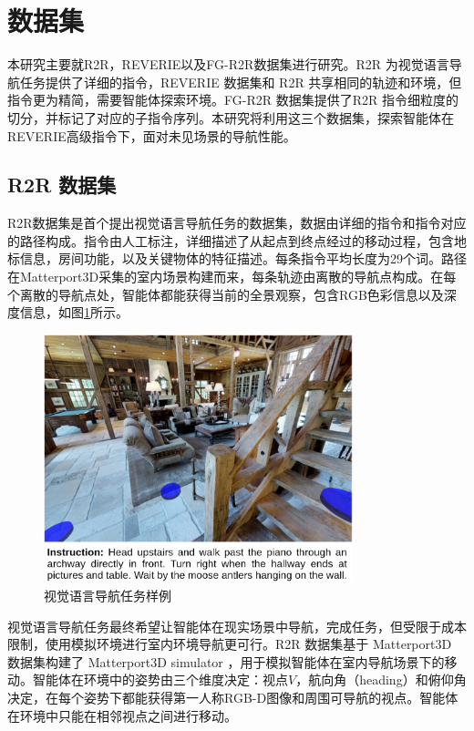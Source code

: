 \documentclass[bachelor]{thesis-uestc}
\begin{document}
\section{数据集}

本研究主要就R2R，REVERIE以及FG-R2R数据集进行研究。R2R 为视觉语言导航任务提供了详细的指令，REVERIE 数据集和 R2R 共享相同的轨迹和环境，但指令更为精简，需要智能体探索环境。FG-R2R 数据集提供了R2R 指令细粒度的切分，并标记了对应的子指令序列。本研究将利用这三个数据集，探索智能体在REVERIE高级指令下，面对未见场景的导航性能。

\subsection{R2R 数据集}
R2R数据集是首个提出视觉语言导航任务的数据集，数据由详细的指令和指令对应的路径构成。指令由人工标注，详细描述了从起点到终点经过的移动过程，包含地标信息，房间功能，以及关键物体的特征描述。每条指令平均长度为29个词。路径在Matterport3D采集的室内场景构建而来，每条轨迹由离散的导航点构成。在每个离散的导航点处，智能体都能获得当前的全景观察，包含RGB色彩信息以及深度信息，如图\ref{r2r}所示。

\begin {figure}[h]
\centering %
\includegraphics[width=0.8\textwidth]{4556-042815.png}
\caption{视觉语言导航任务样例} %
\label{r2r}
\end {figure}

视觉语言导航任务最终希望让智能体在现实场景中导航，完成任务，但受限于成本限制，使用模拟环境进行室内环境导航更可行。R2R 数据集基于 Matterport3D 数据集构建了 Matterport3D simulator ，用于模拟智能体在室内导航场景下的移动。智能体在环境中的姿势由三个维度决定：视点$V$，航向角（heading）和俯仰角决定，在每个姿势下都能获得第一人称RGB-D图像和周围可导航的视点。智能体在环境中只能在相邻视点之间进行移动。
\end{document}
